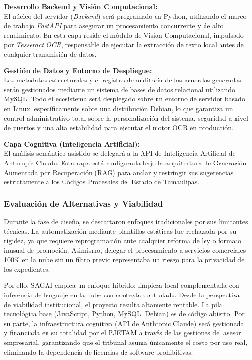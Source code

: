 \textbf{Desarrollo Backend y Visión Computacional:}\\
El núcleo del servidor (\textit{Backend}) será programado en Python, utilizando el marco de trabajo \textit{FastAPI} para asegurar un procesamiento concurrente y de alto rendimiento. En esta capa reside el módulo de Visión Computacional, impulsado por \textit{Tesseract OCR}, responsable de ejecutar la extracción de texto local antes de cualquier transmisión de datos.

\textbf{Gestión de Datos y Entorno de Despliegue:}\\
Los metadatos estructurales y el registro de auditoría de los acuerdos generados serán gestionados mediante un sistema de bases de datos relacional utilizando MySQL. Todo el ecosistema será desplegado sobre un entorno de servidor basado en Linux, específicamente sobre una distribución Debian, lo que garantiza un control administrativo total sobre la personalización del sistema, seguridad a nivel de puertos y una alta estabilidad para ejecutar el motor OCR en producción.

\textbf{Capa Cognitiva (Inteligencia Artificial):}\\
El análisis semántico asistido se delegará a la API de Inteligencia Artificial de Anthropic Claude. Esta capa está configurada bajo la arquitectura de Generación Aumentada por Recuperación (RAG) para anclar y restringir sus sugerencias estrictamente a los Códigos Procesales del Estado de Tamaulipas.

\subsubsection*{Evaluación de Alternativas y Viabilidad}

Durante la fase de diseño, se descartaron enfoques tradicionales por sus limitantes técnicas. La automatización mediante plantillas estáticas fue rechazada por su rigidez, ya que requiere reprogramación ante cualquier reforma de ley o formato inusual de promoción. Asimismo, delegar el procesamiento a servicios comerciales 100\% en la nube sin un filtro previo representaba un riesgo para la privacidad de los expedientes.

Por ello, SAGAI emplea un enfoque híbrido: limpieza local complementada con inferencia de lenguaje en la nube con contexto controlado. Desde la perspectiva de viabilidad institucional, el proyecto resulta altamente rentable. La pila tecnológica base (JavaScript, Python, MySQL, Debian) es de código abierto. Por su parte, la infraestructura cognitiva (API de Anthropic Claude) será gestionada y financiada en su totalidad por el PJETAM a través de las gestiones del asesor empresarial, garantizando que el tribunal asuma únicamente el costo por uso real, eliminando la dependencia de licencias de software prohibitivas.

